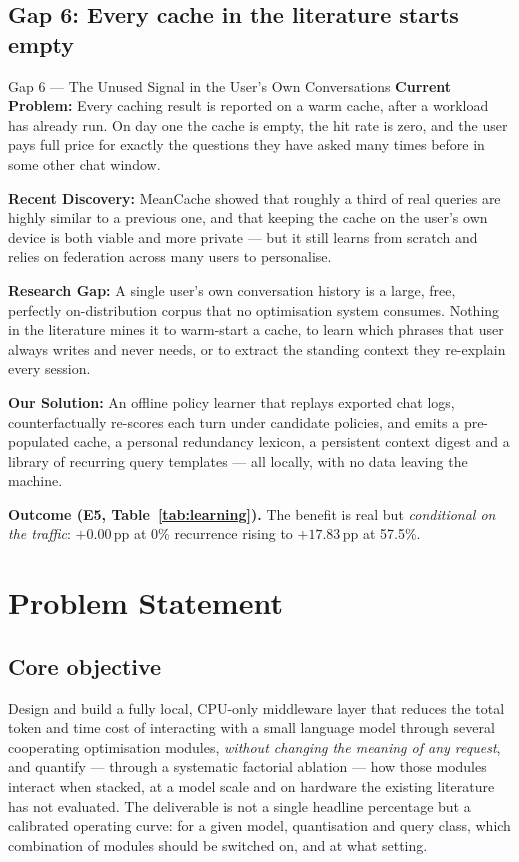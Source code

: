 \documentclass[11pt,a4paper]{article}
\newcommand{\lbl}[1]{\textcolor{accent}{\textbf{#1}}}
\begin{document}
\subsection{Gap 6: Every cache in the literature starts empty}
\begin{gap}{Gap 6 --- The Unused Signal in the User's Own Conversations}
\lbl{Current Problem:} Every caching result is reported on a warm cache, after a
workload has already run. On day one the cache is empty, the hit rate is zero,
and the user pays full price for exactly the questions they have asked many times
before in some other chat window.

\lbl{Recent Discovery:} MeanCache showed that roughly a third of real queries are
highly similar to a previous one, and that keeping the cache on the user's own
device is both viable and more private --- but it still learns from scratch and
relies on federation across many users to personalise.

\lbl{Research Gap:} A single user's own conversation history is a large, free,
perfectly on-distribution corpus that no optimisation system consumes. Nothing in
the literature mines it to warm-start a cache, to learn which phrases that user
always writes and never needs, or to extract the standing context they re-explain
every session.

\lbl{Our Solution:} An offline policy learner that replays exported chat logs,
counterfactually re-scores each turn under candidate policies, and emits a
pre-populated cache, a personal redundancy lexicon, a persistent context digest
and a library of recurring query templates --- all locally, with no data leaving
the machine.
\end{gap}
\noindent\textbf{Outcome (E5, Table~\ref{tab:learning}).} The benefit is real but
\emph{conditional on the traffic}: $+0.00$\,pp at 0\% recurrence rising to
$+17.83$\,pp at 57.5\%.

\section{Problem Statement}
\label{sec:problem}

\subsection{Core objective}
Design and build a fully local, CPU-only middleware layer that reduces the total
token and time cost of interacting with a small language model through several
cooperating optimisation modules, \emph{without changing the meaning of any
request}, and quantify --- through a systematic factorial ablation --- how those
modules interact when stacked, at a model scale and on hardware the existing
literature has not evaluated. The deliverable is not a single headline percentage
but a calibrated operating curve: for a given model, quantisation and query
class, which combination of modules should be switched on, and at what setting.
\end{document}
